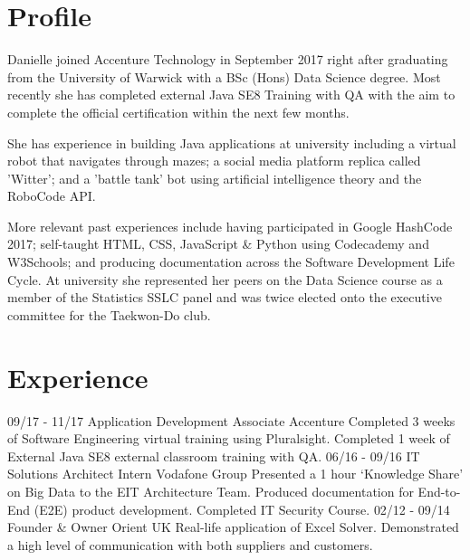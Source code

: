 \documentclass[]{friggeri-cv}
\begin{document}
\section{Profile}
      Danielle joined Accenture Technology in September 2017 right after graduating from the University of Warwick with a BSc (Hons) Data Science degree. Most recently she has completed external Java SE8 Training with QA with the aim to complete the official certification within the next few months.
      
      She has experience in building Java applications at university including a virtual robot that navigates through mazes; a social media platform replica called 'Witter'; and a 'battle tank' bot using artificial intelligence theory and the RoboCode API.
      
      More relevant past experiences include having participated in Google HashCode 2017; self-taught HTML, CSS, JavaScript \& Python using Codecademy and W3Schools; and producing documentation across the Software Development Life Cycle. At university she represented her peers on the Data Science course as a member of the Statistics SSLC panel and was twice elected onto the executive committee for the Taekwon-Do club.

\section{Experience}
\begin{entrylist}
    \entry
    {09/17 - 11/17}
    {Application Development Associate}
    {Accenture}
    {Completed 3 weeks of Software Engineering virtual training using Pluralsight. Completed 1 week of External Java SE8 external classroom training with QA.}
    \entry
    {06/16 - 09/16}
    {IT Solutions Architect Intern}
    {Vodafone Group}
    {Presented a 1 hour ‘Knowledge Share’ on Big Data to the EIT Architecture Team. Produced documentation for End-to-End (E2E) product development. Completed IT Security Course.}
    \entry
    {02/12 - 09/14}
    {Founder \& Owner}
    {Orient UK}
    {Real-life application of Excel Solver. Demonstrated a high level of communication with both suppliers and customers.}
\end{entrylist}
\end{document}
